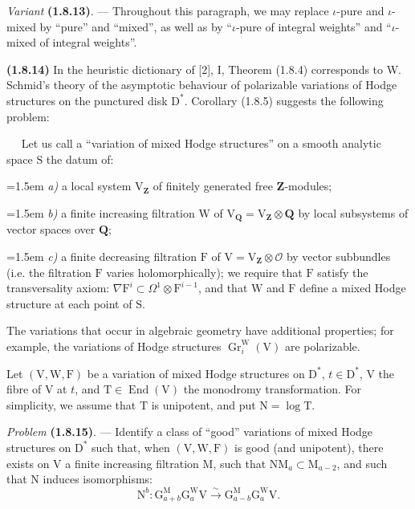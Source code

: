 \documentclass[11pt,leqno]{article}
\newcommand{\Page}[1]{\ifvmode\noindent\else\unskip\ \fi{\footnotesize\textcolor{gray}{[p.\,#1]}}\ \ignorespaces}
\begin{document}
\textit{Variant} \textbf{(1.8.13)}. — Throughout this paragraph, we may replace \(\iota\)-pure and \(\iota\)-mixed by “pure” and “mixed”, as well as by “\(\iota\)-pure of integral weights” and “\(\iota\)-mixed of integral weights”.

\textbf{(1.8.14)} In the heuristic dictionary of [2], I, Theorem (1.8.4) corresponds to W. Schmid’s theory of the asymptotic behaviour of polarizable variations of Hodge structures on the punctured disk \(\mathrm{D}^*\). Corollary (1.8.5) suggests the following problem:

\Page{179}
Let us call a “variation of mixed Hodge structures” on a smooth analytic space \(\mathrm{S}\) the datum of:

\noindent\hangindent=1.5em
\textit{a)} a local system \(\mathrm{V}_{\mathbf{Z}}\) of finitely generated free \(\mathbf{Z}\)-modules;

\noindent\hangindent=1.5em
\textit{b)} a finite increasing filtration \(\mathrm{W}\) of \(\mathrm{V}_{\mathbf{Q}}=\mathrm{V}_{\mathbf{Z}}\otimes\mathbf{Q}\) by local subsystems of vector spaces over \(\mathbf{Q}\);

\noindent\hangindent=1.5em
\textit{c)} a finite decreasing filtration \(\mathrm{F}\) of \(\mathrm{V}=\mathrm{V}_{\mathbf{Z}}\otimes\mathscr{O}\) by vector subbundles (i.e. the filtration \(\mathrm{F}\) varies holomorphically); we require that \(\mathrm{F}\) satisfy the transversality axiom: \(\nabla\mathrm{F}^i\subset\Omega^1\otimes\mathrm{F}^{i-1}\), and that \(\mathrm{W}\) and \(\mathrm{F}\) define a mixed Hodge structure at each point of \(\mathrm{S}\).

\noindent
The variations that occur in algebraic geometry have additional properties; for example, the variations of Hodge structures \(\operatorname{Gr}_i^{\mathrm{W}}(\mathrm{V})\) are polarizable.

Let \((\mathrm{V},\mathrm{W},\mathrm{F})\) be a variation of mixed Hodge structures on \(\mathrm{D}^*\), \(t\in\mathrm{D}^*\), \(\mathrm{V}\) the fibre of \(\mathrm{V}\) at \(t\), and \(\mathrm{T}\in\operatorname{End}(\mathrm{V})\) the monodromy transformation. For simplicity, we assume that \(\mathrm{T}\) is unipotent, and put \(\mathrm{N}=\log\mathrm{T}\).

\textit{Problem} \textbf{(1.8.15)}. — Identify a class of “good” variations of mixed Hodge structures on \(\mathrm{D}^*\) such that, when \((\mathrm{V},\mathrm{W},\mathrm{F})\) is good (and unipotent), there exists on \(\mathrm{V}\) a finite increasing filtration \(\mathrm{M}\), such that \(\mathrm{N}\mathrm{M}_a\subset\mathrm{M}_{a-2}\), and such that \(\mathrm{N}\) induces isomorphisms:
\[
\mathrm{N}^b:
\mathrm{G}_{a+b}^{\mathrm{M}}\mathrm{G}_a^{\mathrm{W}}\mathrm{V}
\xrightarrow{\sim}
\mathrm{G}_{a-b}^{\mathrm{M}}\mathrm{G}_a^{\mathrm{W}}\mathrm{V}.
\]
\end{document}
